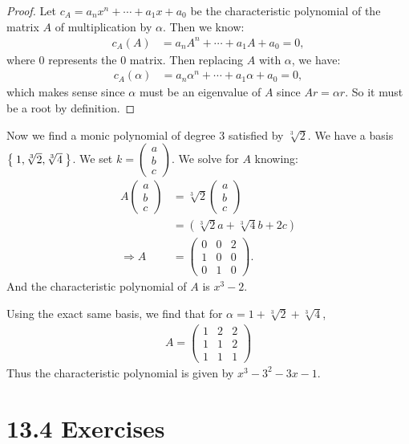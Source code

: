 \documentclass[10pt,oneside,reqno]{amsart}
\theoremstyle{plain}
\theoremstyle{definition}
\theoremstyle{remark}
\theoremstyle{plain}
\renewcommand{\c}{\mathbb{C}}
\newcommand{\bb}{\vspace{3mm}}
\newcommand{\bee}{\begin{equation}\begin{aligned}}
\newcommand{\eee}{\end{aligned}\end{equation}}
\newcommand{\lpar}{\left(}
\newcommand{\rpar}{\right)}
\begin{document}
\begin{enumerate}[label=\arabic*.]
\begin{proof}
Let $c_A = a_nx^n + \cdots + a_1x + a_0$ be the characteristic polynomial of the matrix $A$ of multiplication by $\alpha$. Then we know:
\bee
c_A(A) &= a_nA^n + \cdots + a_1A + a_0 = 0,
\eee
where $0$ represents the 0 matrix. Then replacing $A$ with $\alpha$, we have:
\bee
c_A(\alpha) &= a_n\alpha^n + \cdots + a_1\alpha + a_0 = 0,
\eee
which makes sense since $\alpha$ must be an eigenvalue of $A$ since $Ar = \alpha r$. So it must be a root by definition.
\end{proof}



Now we find a monic polynomial of degree 3 satisfied by $\sqrt[3]{2}$. We have a basis $\Set{1,\sqrt[3]{2},\sqrt[3]{4}}$. We set $k = \lpar 
\begin{matrix}
a\\b\\c
\end{matrix} \rpar$. We solve for $A$ knowing:
\bee
A\lpar 
\begin{matrix}
a\\b\\c
\end{matrix} \rpar &= \sqrt[3]{2}\lpar 
\begin{matrix}
a\\b\\c
\end{matrix} \rpar\\
&= (\sqrt[3]{2}a + \sqrt[3]{4}b + 2c)\\
\Rightarrow A &= \lpar 
\begin{matrix}
0 & 0 & 2\\
1 & 0 & 0\\
0 & 1 & 0
\end{matrix} \rpar.
\eee
And the characteristic polynomial of $A$ is $x^3 - 2$. 


Using the exact same basis, we find that for $\alpha = 1 + \sqrt[3]{2} + \sqrt[3]{4}$, 
\bee
A = \lpar 
\begin{matrix}
1 & 2 & 2\\
1 & 1 & 2\\
1 & 1 & 1
\end{matrix} \rpar
\eee
Thus the characteristic polynomial is given by $x^3 - 3^2 - 3x - 1$. 


\end{enumerate}

\bb\bb


\section*{13.4 Exercises}
\end{document}
